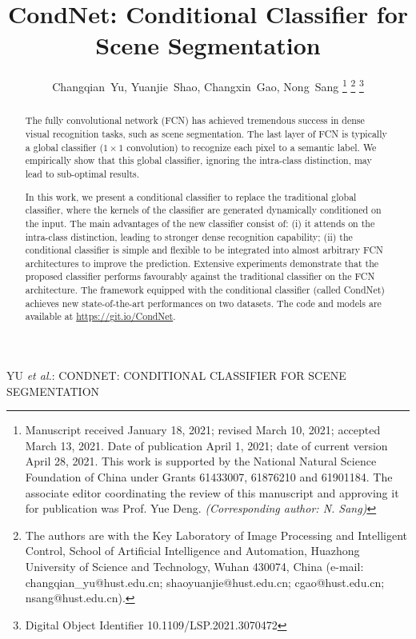 \documentclass[journal]{IEEEtran}
\begin{document}
\title{CondNet: Conditional Classifier for Scene Segmentation}

\author{Changqian~Yu,
Yuanjie~Shao,
Changxin~Gao,
Nong~Sang
\thanks{Manuscript received January 18, 2021; revised March 10, 2021; accepted March 13, 2021. Date of publication April 1, 2021; date of current version April 28, 2021. This work is supported by the National Natural Science Foundation of China under Grants 61433007, 61876210 and 61901184. The associate editor coordinating the review of this manuscript and approving it for publication was Prof. Yue Deng. \textit{(Corresponding author: N. Sang)}}
\thanks{The authors are with the Key Laboratory of Image Processing and Intelligent Control, School of Artificial Intelligence and Automation, Huazhong University of Science and Technology, Wuhan 430074, China (e-mail: changqian\_yu@hust.edu.cn; shaoyuanjie@hust.edu.cn; cgao@hust.edu.cn; nsang@hust.edu.cn).}
\thanks{Digital Object Identifier 10.1109/LSP.2021.3070472}
}

{YU \MakeLowercase{\textit{et al.}}: CONDNET: CONDITIONAL CLASSIFIER FOR SCENE SEGMENTATION}
\maketitle

\begin{abstract}
The fully convolutional network (FCN) has achieved tremendous success 
in dense visual recognition tasks, 
such as scene segmentation.
The last layer of FCN is typically 
a global classifier ($1\times1$ convolution) 
to recognize each pixel to a semantic label.
We empirically show that
this global classifier, 
ignoring the intra-class distinction, 
may lead to sub-optimal results.

In this work, we present a conditional classifier
to replace the traditional global classifier, 
where the kernels of the classifier 
are generated dynamically 
conditioned on the input.
The main advantages of the new classifier consist of:
(i) it attends on the intra-class distinction,
leading to stronger dense recognition capability;
(ii) the conditional classifier is simple and flexible 
to be integrated into almost arbitrary FCN architectures  
to improve the prediction.
Extensive experiments demonstrate 
that the proposed classifier 
performs favourably against the traditional classifier
on the FCN architecture.
The framework
equipped with the conditional classifier
(called CondNet) 
achieves new state-of-the-art performances on two datasets.
The code and models are available at \url{https://git.io/CondNet}.

\end{abstract}
\end{document}
